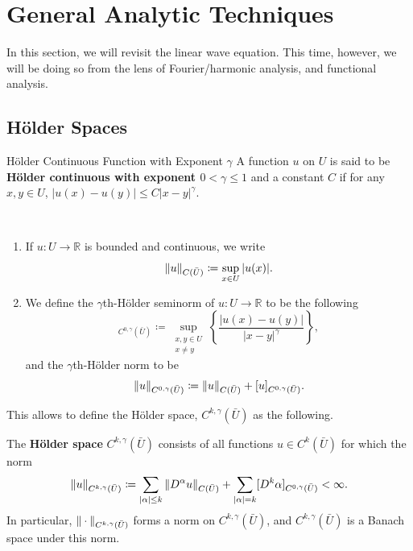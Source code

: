 \documentclass{article}
\numberwithin{equation}{section}
\begin{document}
	\newpage 
	\section{General Analytic Techniques}
	In this section, we will revisit the linear wave equation. This time, however, we will be doing so from the lens of Fourier/harmonic analysis, and functional analysis. 
	
	\subsection{H\"older Spaces}
	\begin{definition}{H\"older Continuous Function with Exponent $\gamma$} A function $u$ on $U$ is said to be \textbf{H\"older continuous with exponent $0 <  \gamma \leq 1$} and a constant $C$ if for any $x, y \in U$, $|u(x) - u(y)| \leq C|x - y|^{\gamma}$. 
	\end{definition}
	
	\begin{definition}
		$ $\newline \vspace{-0.65cm}
		\begin{enumerate}[itemsep =-2pt,label = (\roman{*})]
			\item If $u: U \to \mathbb{R}$ is bounded and continuous, we write  
			\begin{equation*}
				\left\Vert u \right\Vert_{C(\bar{U})} \coloneqq \sup_{x \in U}|u(x)|. 
			\end{equation*}
			\item We define the $\gamma$th-H\"older seminorm of $u: U \to \mathbb{R}$ to be the following 
			\begin{equation*}
				[u]_{C^{0,\gamma}(\bar{U})} \coloneqq \sup_{\substack{x, y \in U \\ x \neq y}}\left\{\frac{|u(x) - u(y)|}{|x - y|^{\gamma}}\right\}, 
			\end{equation*}
			and the $\gamma$th-H\"older norm to be 
			\begin{equation*}
				\left\Vert u \right\Vert_{C^{0,\gamma}(\bar{U})} \coloneqq \left\Vert u \right\Vert_{C(\bar{U})} + [u]_{C^{0,\gamma}(\bar{U})}. 
			\end{equation*}
		\end{enumerate}
	\end{definition}
	
	This allows to define the H\"older space, $C^{k,\gamma}(\bar{U})$ as the following. 
	\begin{definition}
		The \textbf{H\"older space} $C^{k,\gamma}(\bar{U})$ consists of all functions $u \in C^k(\bar{U})$ for which the norm 
		\begin{equation*}
			\left\Vert u \right\Vert_{C^{k,\gamma}(\bar{U})} \coloneqq \sum_{|\alpha|\leq k}\left\Vert D^\alpha u \right\Vert_{C(\bar{U})} + \sum_{|\alpha| = k}[D^k\alpha]_{C^{0,\gamma}(\bar{U})} < \infty. 
		\end{equation*}
		In particular, $\left\Vert \hspace{2pt}\cdot\hspace{2pt} \right\Vert_{C^{k,\gamma}(\bar{U})}$ forms a norm on $C^{k,\gamma}(\bar{U})$, and $C^{k,\gamma}(\bar{U})$ is a Banach space under this norm. 
	\end{definition}
	
\end{document}

